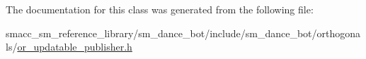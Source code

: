 The documentation for this class was generated from the following file\+:\begin{DoxyCompactItemize}
\item 
smacc\+\_\+sm\+\_\+reference\+\_\+library/sm\+\_\+dance\+\_\+bot/include/sm\+\_\+dance\+\_\+bot/orthogonals/\hyperlink{or__updatable__publisher_8h}{or\+\_\+updatable\+\_\+publisher.\+h}\end{DoxyCompactItemize}
